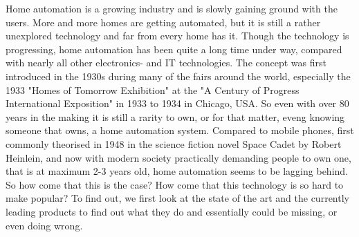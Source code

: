 Home automation is a growing industry and is slowly gaining ground with the users. More and more homes are getting automated, but it is still a rather unexplored technology and far from every home has it. Though the technology is progressing, home automation has been quite a long time under way, compared with nearly all other electronics- and IT technologies. The concept was first introduced in the 1930s during many of the fairs around the world, especially the 1933 "Homes of Tomorrow Exhibition" at the "A Century of Progress International Exposition" in 1933 to 1934 in Chicago, USA. So even with over 80 years in the making it is still a rarity to own, or for that matter, eveng knowing someone that owns, a home automation system. Compared to mobile phones, first commonly theorised in 1948 in the science fiction novel Space Cadet by Robert Heinlein, and now with modern society practically demanding people to own one, that is at maximum 2-3 years old, home automation seems to be lagging behind. So how come that this is the case? How come that this technology is so hard to make popular? To find out, we first look at the state of the art and the currently leading products to find out what they do and essentially could be missing, or even doing wrong.

